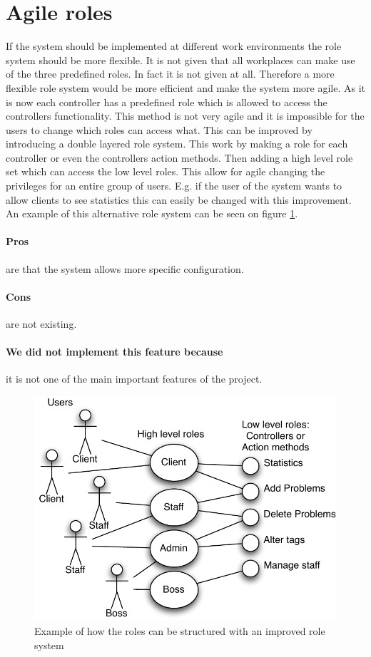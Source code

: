 \section{Agile roles}
\label{sec:agile_roles}
If the system should be implemented at different work environments the role system should be more flexible. 
It is not given that all workplaces can make use of the three predefined roles. 
In fact it is not given at all. 
Therefore a more flexible role system would be more efficient and make the system more agile. 
As it is now each controller has a predefined role which is allowed to access the controllers functionality. 
This method is not very agile and it is impossible for the users to change which roles can access what. 
This can be improved by introducing a double layered role system.  
This work by making a role for each controller or even the controllers action methods. 
Then adding a high level role set which can access the low level roles. 
This allow for agile changing the privileges for an entire group of users. 
E.g. if the user of the system wants to allow clients to see statistics this can easily be changed with this improvement. An example of this alternative role system can be seen on figure \ref{fig:improved_role_system}.

\paragraph{Pros} are that the system allows more specific configuration. 
\paragraph{Cons} are not existing.
\paragraph{We did not implement this feature because} it is not one of the main important features of the project.

\begin{figure}
\begin{center}
\includegraphics[scale=1]{input/epilogue/improvements/improved_role_system.pdf}
\caption{Example of how the roles can be structured with an improved role system}
\label{fig:improved_role_system}
\end{center}
\end{figure}
